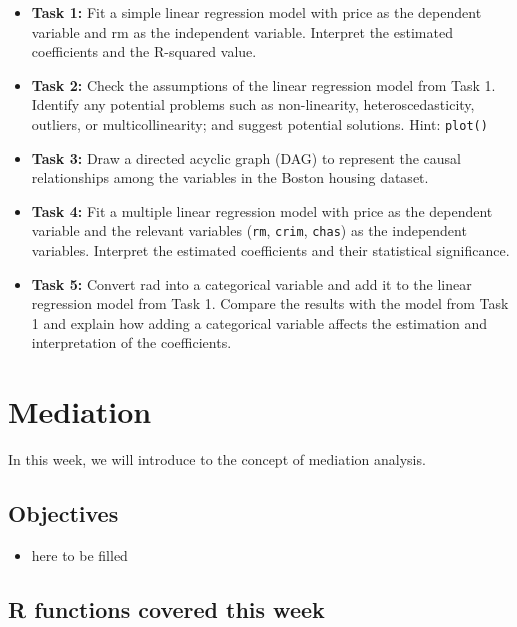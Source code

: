 \documentclass[
]{book}
\providecommand{\tightlist}{%
  \setlength{\itemsep}{0pt}\setlength{\parskip}{0pt}}
\begin{document}
\begin{itemize}
\item
  \textbf{Task 1:} Fit a simple linear regression model with price as the dependent variable and rm as the independent variable. Interpret the estimated coefficients and the R-squared value.
\item
  \textbf{Task 2:} Check the assumptions of the linear regression model from Task 1. Identify any potential problems such as non-linearity, heteroscedasticity, outliers, or multicollinearity; and suggest potential solutions. Hint: \texttt{plot()}
\item
  \textbf{Task 3:} Draw a directed acyclic graph (DAG) to represent the causal relationships among the variables in the Boston housing dataset.
\item
  \textbf{Task 4:} Fit a multiple linear regression model with price as the dependent variable and the relevant variables (\texttt{rm}, \texttt{crim}, \texttt{chas}) as the independent variables. Interpret the estimated coefficients and their statistical significance.
\item
  \textbf{Task 5:} Convert rad into a categorical variable and add it to the linear regression model from Task 1. Compare the results with the model from Task 1 and explain how adding a categorical variable affects the estimation and interpretation of the coefficients.
\end{itemize}

\hypertarget{med}{%
\chapter{Mediation}\label{med}}

In this week, we will introduce to the concept of mediation analysis.

\hypertarget{objectives-7}{%
\section{Objectives}\label{objectives-7}}

\begin{itemize}
\tightlist
\item
  here to be filled
\end{itemize}

\hypertarget{r-functions-covered-this-week-2}{%
\section{R functions covered this week}\label{r-functions-covered-this-week-2}}
\end{document}
